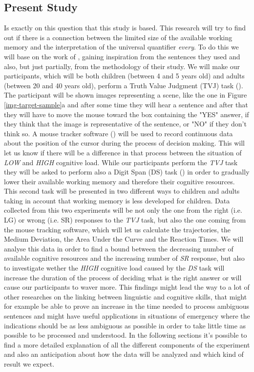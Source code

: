 \documentclass[10pt, a4]{article}
\begin{document}
\subsection{Present Study}
Is exactly on this question that this study is based. This research will try to find out if there is a connection between
the limited size of the available working memory and the interpretation of the universal quantifier \textit{every}. To do this
we will base on the work of \cite{minai2012hinders}, gaining inspiration from the sentences they used and also, but just partially,
from the methodology of their study. We will make our participants, which will be both children (between 4 and 5 years old) and adults
(between 20 and 40 years old), perform a Truth Value
Judgment (TVJ) task (\cite{crain2000investigations}). The participant will be shown images representing a scene, like the one in Figure
\ref{img-target-sample}a and after some time they will hear a sentence and after that they will have to move the mouse toward the box
containing the "YES" answer, if they think that the image is representative of the sentence, or "NO" if they don't think so.
A mouse tracker software (\cite{freeman2010mousetracker}) will be used to record continuous data about the position of the cursor during
the process of decision making. This will let us know if there will be a difference in that process between the situation of \textit{LOW}
and \textit{HIGH} cognitive load. While our participants perform the \textit{TVJ} task they will be asked to perform also a Digit Span (DS)
task (\cite{conway2005working}) in order to gradually lower their available working memory and therefore their cognitive resources. This second task
will be presented in two different ways to children and adults taking in account that working memory is less developed for children.
Data collected from this two experiments will be not only the one from the right (i.e. LG) or wrong (i.e. SR) responses to the \textit{TVJ}
task, but also the one coming from the mouse tracking software, which will let us calculate the trajectories, the Medium Deviation, the Area
Under the Curve and the Reaction Times. We will analyse this data in order to find a bound between the decreasing number of available cognitive
resources and the increasing number of \textit{SR} response, but also to investigate wether the \textit{HIGH} cognitive load caused by the
\textit{DS} task will increase the duration of the process of deciding what is the right answer or will cause our participants to waver more.
This findings might lead the way to a lot of other researches on the linking between linguistic and cognitive skills, that might for example
be able to prove an increase in the time needed to process ambiguous sentences and might have useful applications in situations of emergency
where the indications should be as less ambiguous as possible in order to take little time as possible to be processed and understood.
In the following sections it's possible to find a more detailed explanation of all the different components of the experiment and also an anticipation
about how the data will be analyzed and which kind of result we expect.
\end{document}
